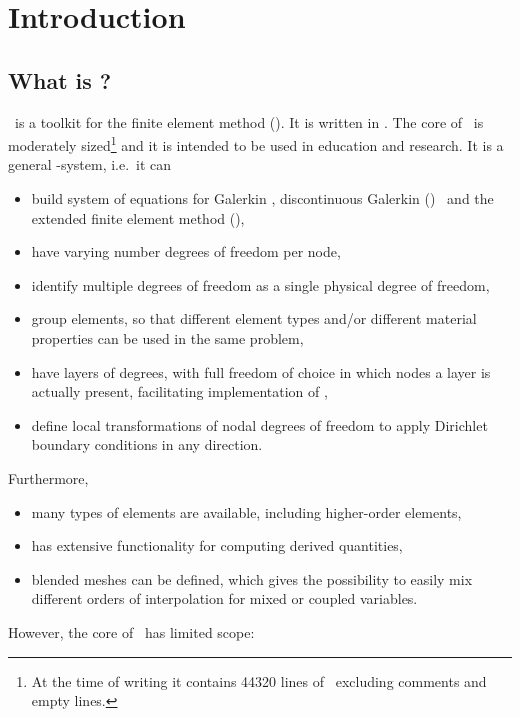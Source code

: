 
\chapter{Introduction}

\def\chaptertitle{Introduction}
\def\headdate{5th September 2025}

\section{What is \tfem?}

\tfem\ is a toolkit for the finite element method (\fem).
It is written in \mftn. The core of \tfem\ is moderately sized\footnote{At the
time of writing it contains 44320
lines of \ftn\, excluding comments and empty lines.}
and it is intended to be used in education and
research. It is a general \fem-system, i.e.\ it can
\begin{itemize}
   \item build system of equations for 
         Galerkin \fem, discontinuous Galerkin (\dg) \fem\ and the extended finite element
         method (\xfem),
   \item have varying number degrees of freedom per node,
   \item identify multiple degrees of freedom as a single physical degree of freedom,
   \item group elements, so that different element types 
         and/or different material properties can be used in the same problem,
   \item have layers of degrees, with full freedom of choice in
         which nodes a layer is actually present,
         facilitating implementation of \xfem,
   \item define local transformations of nodal degrees of freedom to apply Dirichlet boundary conditions
         in any direction.
\end{itemize}
Furthermore,
\begin{itemize}
   \item many types of elements are available, including higher-order elements,
   \item has extensive functionality for computing derived quantities,
   \item blended meshes can be defined, which gives the possibility to easily mix different orders of interpolation for mixed or coupled variables.
\end{itemize}
However, the core of \tfem\ has limited scope:
